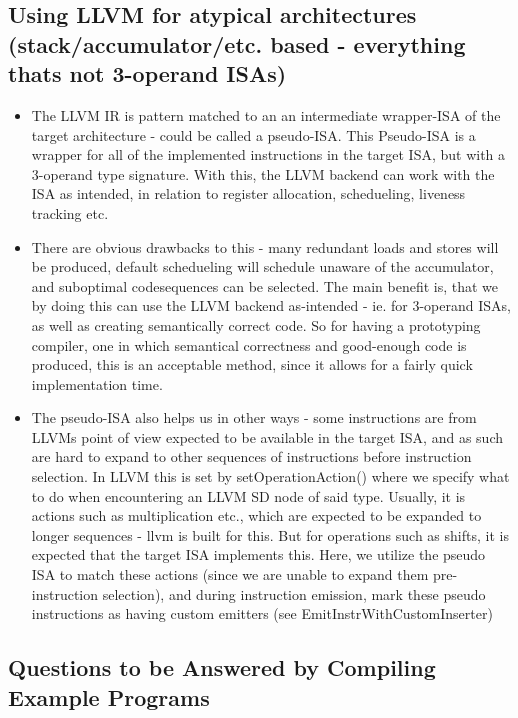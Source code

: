 \documentclass[a4paper,fontsize=10pt,twoside,DIV15,BCOR12mm,headinclude=true,footinclude=false,pagesize,bibtotoc]{scrbook}
\begin{document}
\subsection{Using LLVM for atypical architectures (stack/accumulator/etc. based - everything thats not 3-operand ISAs)}
\begin{itemize}
\item The LLVM IR is pattern matched to an an intermediate wrapper-ISA of the target architecture - could be called a pseudo-ISA. This Pseudo-ISA is a wrapper for all of the implemented instructions in the target ISA, but with a 3-operand type signature. With this, the LLVM backend can work with the ISA as intended, in relation to register allocation, schedueling, liveness tracking etc.

\item There are obvious drawbacks to this - many redundant loads and stores will be produced, default schedueling will schedule unaware of the accumulator, and suboptimal codesequences can be selected. The main benefit is, that we by doing this can use the LLVM backend as-intended - ie. for 3-operand ISAs, as well as creating semantically correct code. So for having a prototyping compiler, one in which semantical correctness and good-enough code is produced, this is an acceptable method, since it allows for a fairly quick implementation time. 
\item The pseudo-ISA also helps us in other ways - some instructions are from LLVMs point of view expected to be available in the target ISA, and as such are hard to expand to other sequences of instructions before instruction selection. In LLVM this is set by setOperationAction() where we specify what to do when encountering an LLVM SD node of said type. Usually, it is actions such as multiplication etc., which are expected to be expanded to longer sequences - llvm is built for this. But for operations such as shifts, it is expected that the target ISA implements this. Here, we utilize the pseudo ISA to match these actions (since we are unable to expand them pre-instruction selection), and during instruction emission, mark these pseudo instructions as having custom emitters (see EmitInstrWithCustomInserter) 
\end{itemize}

\subsection{Questions to be Answered by Compiling Example Programs}
\end{document}
